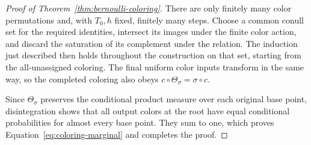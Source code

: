 \begin{proof}[Proof of Theorem~\ref{thm:bernoulli-coloring}]
There are only finitely many color permutations and, with $T_0,h$ fixed,
finitely many steps. Choose a common conull set for the required identities,
intersect its images under the finite color action, and discard the saturation
of its complement under the relation. The induction just described then
holds throughout the construction on that set, starting from the
all-unassigned coloring. The final uniform color inputs transform in the
same way, so the completed coloring also obeys
$c\circ\Theta_\sigma=\sigma\circ c$.

Since $\Theta_\sigma$ preserves the conditional product measure over each
original base point, disintegration shows that all output colors at the
root have equal conditional probabilities for almost every base point.
They sum to one, which proves Equation~\eqref{eq:coloring-marginal} and
completes the proof.
\end{proof}

